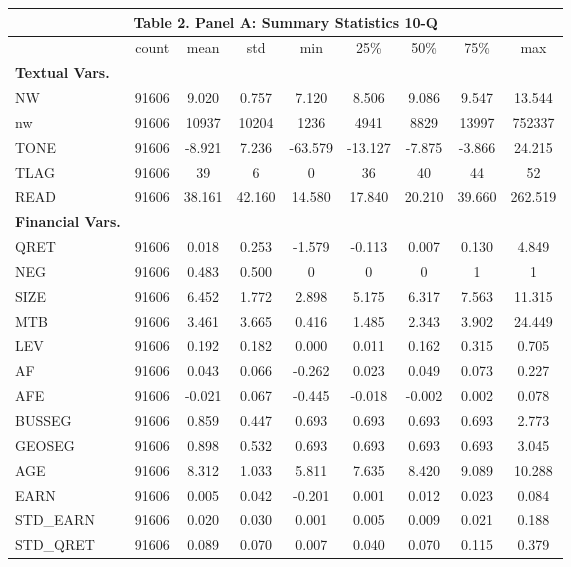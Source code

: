 \begin{table}[htbp] \label{T2PA}
  \centering
    \begin{tabular}{lcccccccc}
    \multicolumn{9}{c}{\textbf{Table 2. Panel A: Summary Statistics 10-Q}} \\
    \midrule
    \midrule
      & count & mean & std & min & 25\% & 50\% & 75\% & max \\
    \midrule
    \textbf{Textual Vars.} &   &   &   &   &   &   &   &  \\
    NW & 91606 & 9.020 & 0.757 & 7.120 & 8.506 & 9.086 & 9.547 & 13.544 \\
    nw & 91606 & 10937 & 10204 & 1236 & 4941 & 8829 & 13997 & 752337 \\
    TONE & 91606 & -8.921 & 7.236 & -63.579 & -13.127 & -7.875 & -3.866 & 24.215 \\
    TLAG & 91606 & 39 & 6 & 0 & 36 & 40 & 44 & 52 \\
    READ & 91606 & 38.161 & 42.160 & 14.580 & 17.840 & 20.210 & 39.660 & 262.519 \\
    \textbf{Financial Vars.} &   &   &   &   &   &   &   &  \\
    QRET & 91606 & 0.018 & 0.253 & -1.579 & -0.113 & 0.007 & 0.130 & 4.849 \\
    NEG & 91606 & 0.483 & 0.500 & 0 & 0 & 0 & 1 & 1 \\
    SIZE & 91606 & 6.452 & 1.772 & 2.898 & 5.175 & 6.317 & 7.563 & 11.315 \\
    MTB & 91606 & 3.461 & 3.665 & 0.416 & 1.485 & 2.343 & 3.902 & 24.449 \\
    LEV & 91606 & 0.192 & 0.182 & 0.000 & 0.011 & 0.162 & 0.315 & 0.705 \\
    AF & 91606 & 0.043 & 0.066 & -0.262 & 0.023 & 0.049 & 0.073 & 0.227 \\
    AFE & 91606 & -0.021 & 0.067 & -0.445 & -0.018 & -0.002 & 0.002 & 0.078 \\
    BUSSEG & 91606 & 0.859 & 0.447 & 0.693 & 0.693 & 0.693 & 0.693 & 2.773 \\
    GEOSEG & 91606 & 0.898 & 0.532 & 0.693 & 0.693 & 0.693 & 0.693 & 3.045 \\
    AGE & 91606 & 8.312 & 1.033 & 5.811 & 7.635 & 8.420 & 9.089 & 10.288 \\
    EARN & 91606 & 0.005 & 0.042 & -0.201 & 0.001 & 0.012 & 0.023 & 0.084 \\
    STD\_EARN & 91606 & 0.020 & 0.030 & 0.001 & 0.005 & 0.009 & 0.021 & 0.188 \\
    STD\_QRET & 91606 & 0.089 & 0.070 & 0.007 & 0.040 & 0.070 & 0.115 & 0.379 \\
    \bottomrule
    \bottomrule
    \end{tabular}%
\end{table}%
